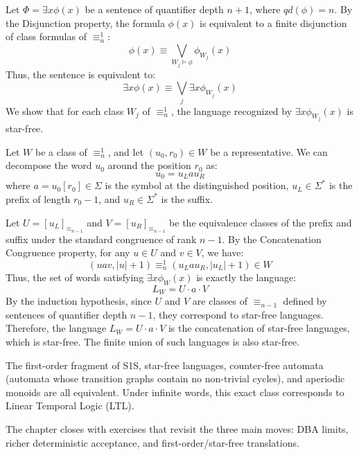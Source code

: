 \begin{formaldetails}
Let $\Phi = \exists x \phi(x)$ be a sentence of quantifier depth $n+1$, where $qd(\phi) = n$.
By the Disjunction property, the formula $\phi(x)$ is equivalent to a finite disjunction of class formulas of $\equiv_n^1$:
$$\phi(x) \equiv \bigvee_{W_j \models \phi} \phi_{W_j}(x)$$
Thus, the sentence is equivalent to:
$$\exists x \phi(x) \equiv \bigvee_{j} \exists x \phi_{W_j}(x)$$
We show that for each class $W_j$ of $\equiv_n^1$, the language recognized by $\exists x \phi_{W_j}(x)$ is star-free.

Let $W$ be a class of $\equiv_n^1$, and let $(u_0, r_0) \in W$ be a representative. We can decompose the word $u_0$ around the position $r_0$ as:
$$u_0 = u_{L} a u_{R}$$
where $a = u_0[r_0] \in \Sigma$ is the symbol at the distinguished position, $u_{L} \in \Sigma^*$ is the prefix of length $r_0 - 1$, and $u_{R} \in \Sigma^*$ is the suffix.

Let $U = [u_{L}]_{\equiv_{n-1}}$ and $V = [u_{R}]_{\equiv_{n-1}}$ be the equivalence classes of the prefix and suffix under the standard congruence of rank $n-1$.
By the Concatenation Congruence property, for any $u \in U$ and $v \in V$, we have:
$$(u a v, |u|+1) \equiv_n^1 (u_{L} a u_{R}, |u_{L}|+1) \in W$$
Thus, the set of words satisfying $\exists x \phi_{W}(x)$ is exactly the language:
$$L_W = U \cdot a \cdot V$$
By the induction hypothesis, since $U$ and $V$ are classes of $\equiv_{n-1}$ defined by sentences of quantifier depth $n-1$, they correspond to star-free languages.
Therefore, the language $L_W = U \cdot a \cdot V$ is the concatenation of star-free languages, which is star-free. The finite union of such languages is also star-free.
\end{formaldetails}

\begin{summarybox}
The first-order fragment of S1S, star-free languages, counter-free automata (automata whose transition graphs contain no non-trivial cycles), and aperiodic monoids are all equivalent. Under infinite words, this exact class corresponds to Linear Temporal Logic (LTL).
\end{summarybox}

The chapter closes with exercises that revisit the three main moves: DBA limits, richer deterministic acceptance, and first-order/star-free translations.

